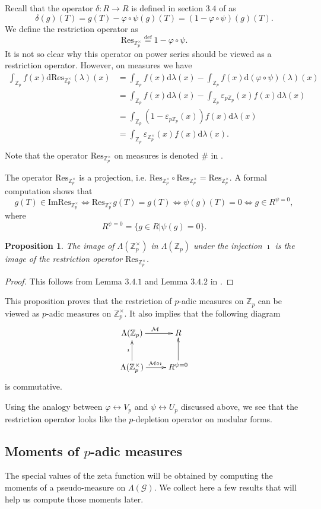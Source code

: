 \documentclass[twoside,10pt]{article}
\newtheorem{prop}{Proposition}
\newcommand{\rarr}{\rightarrow}
\newcommand{\Z}{\mathbb{Z}}
\newcommand{\curlG}{\mathcal{G}}
\newcommand{\curlM}{\mathcal{M}}
\newcommand{\eqdef}{\overset{\text{def}}{=}}
\newcommand{\charf}{\varepsilon}
\renewcommand{\d}{\text{d}}
\newcommand{\Res}{\text{Res}_{\Z_p^\times}}
\begin{document}
Recall that the operator $\delta:R\rarr R$ is defined in section $3.4$ of \cite{CS} as
\[\delta(g)(T)=g(T)-\varphi\circ\psi(g)(T)=(1-\varphi\circ\psi)(g)(T).\]
We define the restriction operator as
\[\Res\eqdef 1-\varphi\circ\psi.\]
It is not so clear why this operator on power series should be viewed as a restriction operator. However, on measures we have
\begin{align*}
	\int_{\Z_p}f(x)\d\Res(\lambda)(x) 	&= \int_{\Z_p}f(x)\d\lambda(x)-\int_{\Z_p}f(x)\d(\varphi\circ\psi)(\lambda)(x)\\																&= \int_{\Z_p}f(x)\d\lambda(x)-\int_{\Z_p}\charf_{p\Z_p}(x)f(x)\d\lambda(x)\\
										&= \int_{\Z_p}(1-\charf_{p\Z_p}(x))f(x)\d\lambda(x)\\
										&= \int_{\Z_p}\charf_{\Z_p^\times}(x)f(x)\d\lambda(x).\\
\end{align*}
Note that the operator $\Res$ on measures is denoted $\#$ in \cite{CS}.

The operator $\Res$ is a projection, i.e. $\Res\circ\Res=\Res$. A formal computation shows that
\[g(T)\in\text{Im}\Res\Leftrightarrow\Res g(T)=g(T) \Leftrightarrow \psi(g)(T)=0\Leftrightarrow g\in R^{\psi=0},\]
where
\[R^{\psi=0}=\{g\in R|\psi(g)=0\}.\]

\begin{prop}
	The image of $\Lambda(\Z_p^\times)$ in $\Lambda(\Z_p)$ under the injection $\imath$ is the image of the restriction operator $\Res$.
\end{prop}
\begin{proof}
	This follows from Lemma $3.4.1$ and Lemma $3.4.2$ in \cite{CS}.
\end{proof}

This proposition proves that the restriction of $p$-adic measures on $\Z_p$ can be viewed as $p$-adic measures on $\Z_p^\times$. It also implies that the following diagram
\[\xymatrix{
	\Lambda(\Z_p)\ar[r]^{\curlM} & R\\
	\Lambda(\Z_p^\times)\ar[u]^{\imath}\ar[r]^{\curlM\circ\imath} & R^{\psi=0}\ar[u]
}\]
is commutative.

Using the analogy between $\varphi\leftrightarrow V_p$ and $\psi\leftrightarrow U_p$ discussed above, we see that the restriction operator looks like the $p$-depletion operator on modular forms.

\subsection{Moments of $p$-adic measures}
The special values of the zeta function will be obtained by computing the moments of a pseudo-measure on $\Lambda(\curlG)$. We collect here a few results that will help us compute those moments later.
\end{document}
